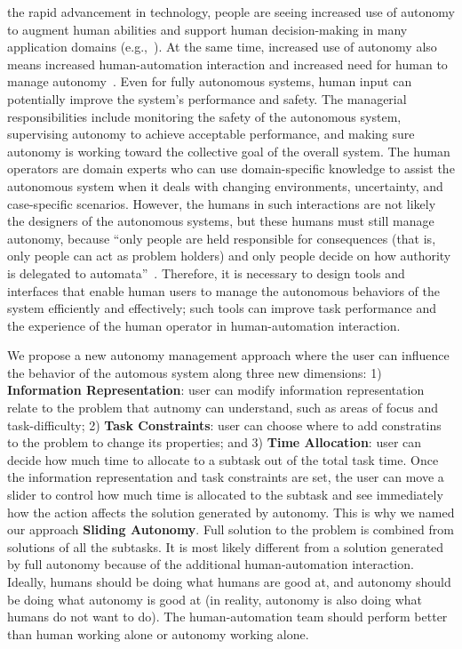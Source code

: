 \documentclass[journal]{IEEEtran}
\begin{document}
 the rapid advancement in technology, people are seeing increased use of autonomy to augment human abilities and support human decision-making in many application domains (e.g.,~\cite{Chun2010Limousine,Casper2003Human,Lin2010Supporting,Robins2009From}). At the same time, increased use of autonomy also means increased human-automation interaction and increased need for human to manage autonomy~\cite{Bainbridge1983Ironies}. Even for fully autonomous systems, human input can potentially improve the system's performance and safety. The managerial responsibilities include monitoring the safety of the autonomous system, supervising autonomy to achieve acceptable performance, and making sure autonomy is working toward the collective goal of the overall system. The human operators are domain experts who can use domain-specific knowledge to assist the autonomous system when it deals with changing environments, uncertainty, and case-specific scenarios. However, the humans in such interactions are not likely the designers of the autonomous systems, but these humans must still manage autonomy, because ``only people are held responsible for consequences (that is, only people can act as problem holders) and only people decide on how authority is delegated to automata''~\cite{Woods2006Joint,Bradshaw2013Seven}. Therefore, it is necessary to design tools and interfaces that enable human users to manage the autonomous behaviors of the system efficiently and effectively; such tools can improve task performance and the experience of the human operator in human-automation interaction.

We propose a new autonomy management approach where the user can influence the behavior of the automous system along three new dimensions: 1) \textbf{Information Representation}: user can modify information representation relate to the problem that autnomy can understand, such as areas of focus and task-difficulty; 2) \textbf{Task Constraints}: user can choose where to add constratins to the problem to change its properties; and 3) \textbf{Time Allocation}: user can decide how much time to allocate to a subtask out of the total task time. Once the information representation and task constraints are set, the user can move a slider to control how much time is allocated to the subtask and see immediately how the action affects the solution generated by autonomy. This is why we named our approach \textbf{Sliding Autonomy}. Full solution to the problem is combined from solutions of all the subtasks. It is most likely different from a solution generated by full autonomy because of the additional human-automation interaction. Ideally, humans should be doing what humans are good at, and autonomy should be doing what autonomy is good at (in reality, autonomy is also doing what humans do not want to do). The human-automation team should perform better than human working alone or autonomy working alone.
\end{document}
